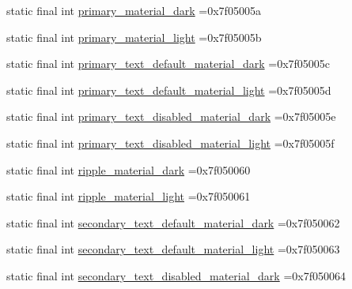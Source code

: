 \begin{DoxyCompactItemize}
\item 
static final int \mbox{\hyperlink{classcom_1_1example_1_1trainawearapplication_1_1_r_1_1color_a9f05815a68664959e3b3d2644adce087}{primary\+\_\+material\+\_\+dark}} =0x7f05005a
\item 
static final int \mbox{\hyperlink{classcom_1_1example_1_1trainawearapplication_1_1_r_1_1color_a734519d0a407fc238106767df2e092f3}{primary\+\_\+material\+\_\+light}} =0x7f05005b
\item 
static final int \mbox{\hyperlink{classcom_1_1example_1_1trainawearapplication_1_1_r_1_1color_a6712d91c801743ad346c9ce5018e7803}{primary\+\_\+text\+\_\+default\+\_\+material\+\_\+dark}} =0x7f05005c
\item 
static final int \mbox{\hyperlink{classcom_1_1example_1_1trainawearapplication_1_1_r_1_1color_a4d1eae9dd95e52bf1aebcc04d6a0cc45}{primary\+\_\+text\+\_\+default\+\_\+material\+\_\+light}} =0x7f05005d
\item 
static final int \mbox{\hyperlink{classcom_1_1example_1_1trainawearapplication_1_1_r_1_1color_a39c5e55531ec614de684a2c247e73e61}{primary\+\_\+text\+\_\+disabled\+\_\+material\+\_\+dark}} =0x7f05005e
\item 
static final int \mbox{\hyperlink{classcom_1_1example_1_1trainawearapplication_1_1_r_1_1color_a2d94fb10b75db7df8ee9da751f5b19ae}{primary\+\_\+text\+\_\+disabled\+\_\+material\+\_\+light}} =0x7f05005f
\item 
static final int \mbox{\hyperlink{classcom_1_1example_1_1trainawearapplication_1_1_r_1_1color_a8bf287d8fac4e01ed9cf8692ec9bb154}{ripple\+\_\+material\+\_\+dark}} =0x7f050060
\item 
static final int \mbox{\hyperlink{classcom_1_1example_1_1trainawearapplication_1_1_r_1_1color_ab1a521e9cc946363bd2acc6194a742d3}{ripple\+\_\+material\+\_\+light}} =0x7f050061
\item 
static final int \mbox{\hyperlink{classcom_1_1example_1_1trainawearapplication_1_1_r_1_1color_ab8e6b75d2dde085a82decddc293c8594}{secondary\+\_\+text\+\_\+default\+\_\+material\+\_\+dark}} =0x7f050062
\item 
static final int \mbox{\hyperlink{classcom_1_1example_1_1trainawearapplication_1_1_r_1_1color_ade68108f37594b32c32a9e61b83dfe5e}{secondary\+\_\+text\+\_\+default\+\_\+material\+\_\+light}} =0x7f050063
\item 
static final int \mbox{\hyperlink{classcom_1_1example_1_1trainawearapplication_1_1_r_1_1color_a8f96ef66c88df9e4ce92c973216eff5a}{secondary\+\_\+text\+\_\+disabled\+\_\+material\+\_\+dark}} =0x7f050064

\end{DoxyCompactItemize}
